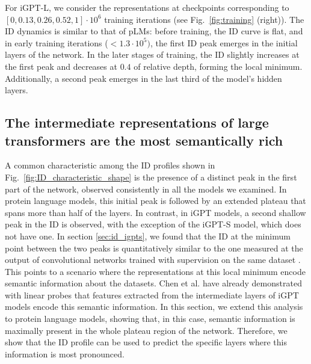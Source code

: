 \documentclass{article}
\begin{document}
For iGPT-L, we consider the representations at checkpoints corresponding to $[0, 0.13, 0.26, 0.52, 1]\cdot 10^6$ training iterations (see Fig.~\ref{fig:training} (right)). 
%
The ID dynamics is similar to that of pLMs: before training, the ID curve is flat, and in early training iterations ($< 1.3\cdot 10^5)$, the first ID peak emerges in the initial layers of the network.
%
In the later stages of training, the ID slightly increases at the first peak and decreases at $0.4$ of relative depth, forming the local minimum. Additionally, a second peak emerges in the last third of the model's hidden layers.


\subsection{The intermediate representations of large transformers are the most semantically rich}
\label{sec:neigh_overlap_gt}

A common characteristic among the ID profiles shown in
Fig.~\ref{fig:ID_characteristic_shape} is the presence of a distinct peak in the first part of the network, observed consistently in all the models we examined. 
%
In protein language models, this initial peak is followed by an extended plateau that spans more than half of the layers. In contrast, in iGPT models, a second shallow peak in the ID is observed, with the exception of the iGPT-S model, which does not have one.
%
In section \ref{sec:id_igpts}, we found that the ID at the minimum point between the two peaks is quantitatively similar to the one measured at the output of convolutional networks trained with supervision on the same dataset \cite{ansuini2019intrinsic}. 
%
This points to a scenario where the representations at this local minimum encode semantic information about the datasets. 
%
Chen et al. \cite{igpt} have already demonstrated with linear probes that features extracted from the intermediate layers of iGPT models encode this semantic information.
%
In this section, we extend this analysis to protein language models, showing that, in this case, semantic information is maximally present in the whole plateau region of the network. Therefore, we show that the ID profile can be used to predict the specific layers where this information is most pronounced.
%
\end{document}
